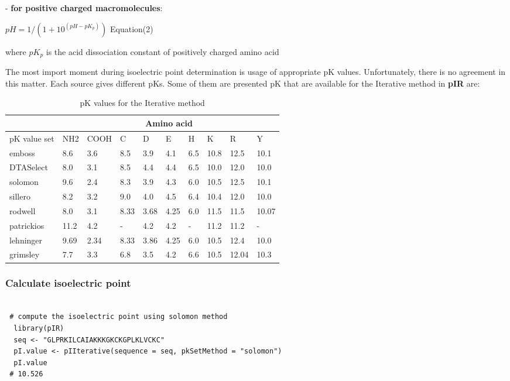\documentclass{article}
\begin{document}
- \textbf{for positive charged macromolecules}:

\begin{center}
       \( pH = 1/(1+10^{(pH - pK_p)}) \)   Equation(2)
\end{center}

where \(pK_p\) is the acid dissociation constant of positively charged amino acid


The most import moment during isoelectric point determination is usage of appropriate pK values. Unfortunately, there is no agreement in this matter. Each source gives different pKs. Some of them are presented pK that are available for the Iterative method in \textbf{pIR} are:

\begin{table}[h]
\centering
\caption{pK values for the Iterative method}
\label{my-label}
\begin{tabular}{|l|l|l|l|l|l|l|l|l|l|}
\hline
                   & \multicolumn{9}{c|}{{\bf Amino acid}}  \\ \hline
{pK value set} & NH2 & COOH & C & D & E & H & K & R & Y \\ \hline
emboss         & 8.6 & 3.6 & 8.5 & 3.9 & 4.1 & 6.5 & 10.8 & 12.5 & 10.1 \\ \hline
DTASelect      & 8.0 & 3.1 & 8.5 & 4.4 & 4.4 & 6.5 & 10.0 & 12.0 & 10.0 \\ \hline
solomon        & 9.6 & 2.4 & 8.3 & 3.9 & 4.3 & 6.0 & 10.5 & 12.5 & 10.1 \\ \hline
sillero        & 8.2 & 3.2 & 9.0 & 4.0 & 4.5 & 6.4 & 10.4 & 12.0 & 10.0 \\ \hline
rodwell        & 8.0 & 3.1 & 8.33 & 3.68 & 4.25 & 6.0 & 11.5 & 11.5 & 10.07 \\ \hline
patrickios     & 11.2 & 4.2 & - & 4.2 & 4.2 & - & 11.2 & 11.2 & -           \\ \hline
lehninger      & 9.69 & 2.34 & 8.33 & 3.86 & 4.25 & 6.0 & 10.5 & 12.4 & 10.0\\ \hline
grimsley       & 7.7 & 3.3 & 6.8 & 3.5 & 4.2 & 6.6 & 10.5 & 12.04 & 10.3    \\ \hline
\end{tabular}
\end{table}

\subsubsection{Calculate isoelectric point}

\begin{verbatim}

 # compute the isoelectric point using solomon method
  library(pIR)
  seq <- "GLPRKILCAIAKKKGKCKGPLKLVCKC"
  pI.value <- pIIterative(sequence = seq, pkSetMethod = "solomon")
  pI.value
 # 10.526

\end{verbatim}
\end{document}
